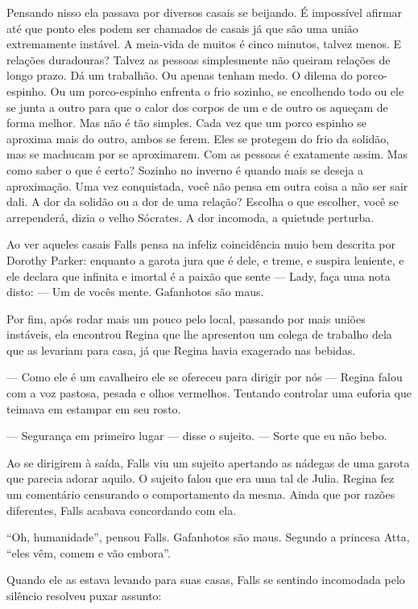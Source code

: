 Pensando nisso ela passava por diversos casais se beijando. É impossível afirmar até que ponto eles podem ser chamados de casais já que são uma união extremamente instável. A meia-vida de muitos é cinco minutos, talvez menos. E relações duradouras? Talvez as pessoas simplesmente não queiram relações de longo prazo. Dá um trabalhão. Ou apenas tenham medo. O dilema do porco-espinho. Ou um porco-espinho enfrenta o frio sozinho, se encolhendo todo\mudanca{,} ou ele se junta a outro para que o calor dos corpos de um e de outro os aqueçam de forma melhor. Mas não é tão simples. Cada vez que um porco espinho se aproxima mais do outro, ambos se ferem. Eles se protegem do frio da solidão, mas se machucam por se aproximarem. Com as pessoas é exatamente assim. Mas como saber o que é certo? Sozinho no inverno é quando mais se deseja a aproximação. Uma vez conquistada, você não pensa em outra coisa a não ser sair dali. A dor da solidão ou a dor de uma relação? Escolha o que escolher, você se arrependerá, dizia o velho Sócrates. A dor incomoda, a quietude perturba.

Ao ver aqueles casais\mudanca{,} Falls pensa na infeliz coincidência muio bem descrita por Dorothy Parker: enquanto a garota jura que é dele, e treme, e suspira leniente, e ele declara que infinita e imortal é a paixão que sente --- Lady, faça uma nota disto: --- Um de vocês mente. Gafanhotos são maus.

Por fim, após rodar mais um pouco pelo local, passando por mais uniões instáveis, ela encontrou Regina\mudanca{,} que lhe apresentou um colega de trabalho dela que as levariam para casa, já que Regina havia exagerado nas bebidas.

--- Como ele é um cavalheiro ele se ofereceu para dirigir por nós --- Regina falou com a voz pastosa, pesada e olhos vermelhos. Tentando controlar uma euforia que teimava em estampar em seu rosto.

--- Segurança em primeiro lugar --- disse o sujeito. --- Sorte que eu não bebo.

Ao se dirigirem à saída, Falls viu um sujeito apertando as nádegas de uma garota que parecia adorar aquilo. O sujeito falou que era uma tal de Julia. Regina fez um comentário censurando o comportamento da mesma. Ainda que por razões diferentes, Falls acabava concordando com ela.

``Oh, humanidade'', pensou Falls. Gafanhotos são maus. Segundo a princesa Atta, ``eles vêm, comem e vão embora''.

Quando ele as estava levando para suas casas, Falls se sentindo incomodada pelo silêncio resolveu puxar assunto:

